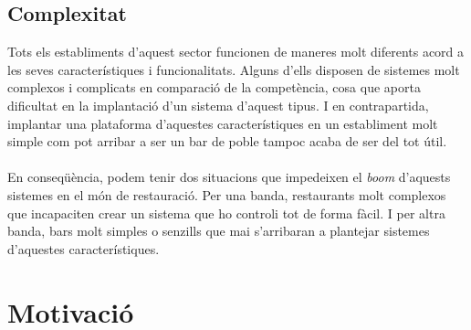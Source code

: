 \subsection{Complexitat}

Tots els establiments d'aquest sector funcionen de maneres molt diferents acord a les seves característiques i funcionalitats. Alguns d'ells disposen de sistemes molt complexos i complicats en comparació de la competència, cosa que aporta dificultat en la implantació d'un sistema d'aquest tipus. I en contrapartida, implantar una plataforma d'aquestes característiques en un establiment molt simple com pot arribar a ser un bar de poble tampoc acaba de ser del tot útil.
\\\\
En conseqüència, podem tenir dos situacions que impedeixen el \textit{boom} d'aquests sistemes en el món de restauració. Per una banda, restaurants molt complexos que incapaciten crear un sistema que ho controli tot de forma fàcil. I per altra banda, bars molt simples o senzills que mai s'arribaran a plantejar sistemes d'aquestes característiques.


\section{Motivació}

